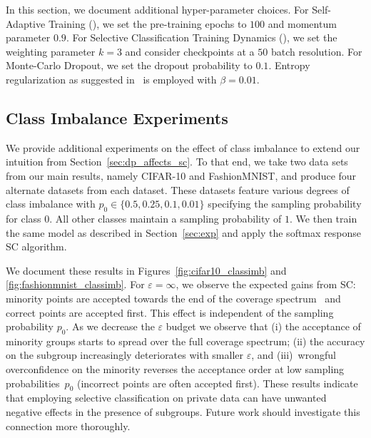 In this section, we document additional hyper-parameter choices. For Self-Adaptive Training (\sat), we set the pre-training epochs to $100$ and momentum parameter $0.9$. For Selective Classification Training Dynamics (\sctd), we set the weighting parameter $k=3$ and consider checkpoints at a $50$ batch resolution. For Monte-Carlo Dropout, we set the dropout probability to $0.1$. Entropy regularization as suggested in~\citet{feng2023towards} is employed with $\beta = 0.01$.

\subsection{Class Imbalance Experiments}
\label{sec:class_imb_real}

We provide additional experiments on the effect of class imbalance to extend our intuition from Section~\ref{sec:dp_affects_sc}. To that end, we take two data sets from our main results, namely CIFAR-10 and FashionMNIST, and produce four alternate datasets from each dataset. These datasets feature various degrees of class imbalance with $p_0 \in \{0.5,0.25,0.1,0.01\}$ specifying the sampling probability for class $0$. All other classes maintain a sampling probability of $1$. We then train the same model as described in Section~\ref{sec:exp} and apply the softmax response SC algorithm. 

We document these results in Figures~\ref{fig:cifar10_classimb} and \ref{fig:fashionmnist_classimb}. For $\varepsilon = \infty$, we observe the expected gains from SC: minority points are accepted towards the end of the coverage spectrum~\citep{jones2020selective} and correct points are accepted first. This effect is independent of the sampling probability $p_0$. As we decrease the $\varepsilon$ budget we observe that (i) the acceptance of minority groups starts to spread over the full coverage spectrum; (ii) the accuracy on the subgroup increasingly deteriorates with smaller $\varepsilon$, and (iii)~wrongful overconfidence on the minority reverses the acceptance order at low sampling probabilities~$p_0$ (\ie incorrect points are often accepted first). These results indicate that employing selective classification on private data can have unwanted negative effects in the presence of subgroups. Future work should investigate this connection more thoroughly.

